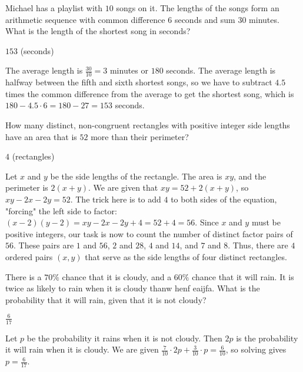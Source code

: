 \documentclass[11pt]{article}
\begin{document}
\begin{problem}%
Michael has a playlist with $10$ songs on it. The lengths of the songs form an arithmetic sequence with common difference $6$ seconds and sum $30$ minutes. What is the length of the shortest song in seconds?
\end{problem}

\begin{answer}
$\boxed{153}$ (seconds)
\end{answer}

\begin{solution}
The average length is $\frac{30}{10} = 3$ minutes or $180$ seconds. The average length is halfway between the fifth and sixth shortest songs, so we have to subtract $4.5$ times the common difference from the average to get the shortest song, which is $180 - 4.5 \cdot 6 = 180 - 27 = \boxed{153}$ seconds.
\end{solution}



\begin{problem}%
How many distinct, non-congruent rectangles with positive integer side lengths have an area that is $52$ more than their perimeter?
\end{problem}

\begin{answer}
$\boxed{4}$ (rectangles)
\end{answer}

\begin{solution}
Let $x$ and $y$ be the side lengths of the rectangle. The area is $xy$, and the perimeter is $2(x+y)$. We are given that $xy = 52 + 2(x+y)$, so $xy - 2x - 2y = 52$. The trick here is to add $4$ to both sides of the equation, "forcing" the left side to factor: $(x-2)(y-2) = xy - 2x - 2y + 4 = 52 + 4 = 56$. Since $x$ and $y$ must be positive integers, our task is now to count the number of distinct factor pairs of $56$. These pairs are $1$ and $56$, $2$ and $28$, $4$ and $14$, and $7$ and $8$. Thus, there are $\boxed{4}$ ordered pairs $(x, y)$ that serve as the side lengths of four distinct rectangles.
\end{solution}


\begin{problem}%
There is a $70\%$ chance that it is cloudy, and a $60\%$ chance that it will rain. It is twice as likely to rain when it is cloudy thanw henf eaijfa. What is the probability that it will rain, given that it is not cloudy?
\end{problem}

\begin{answer}
$\boxed{\frac{6}{17}}$
\end{answer}

\begin{solution}
Let $p$ be the probability it rains when it is not cloudy. Then $2p$ is the probability it will rain when it is cloudy. We are given $\frac{7}{10} \cdot 2p + \frac{3}{10} \cdot p = \frac{6}{10}$, so solving gives $p = \boxed{\frac{6}{17}}$.
\end{solution}
\end{document}
